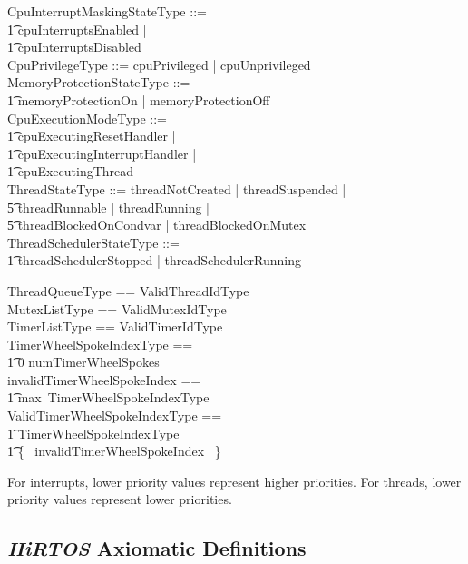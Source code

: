 \documentclass[11pt,letterpaper,twoside,openany]{book}
\begin{document}
\begin{zed}
    CpuInterruptMaskingStateType ::= \\
    \t1 cpuInterruptsEnabled | \\
    \t1 cpuInterruptsDisabled \\
    CpuPrivilegeType ::= cpuPrivileged | cpuUnprivileged \\
    MemoryProtectionStateType ::= \\
    \t1 memoryProtectionOn | memoryProtectionOff \\
    CpuExecutionModeType ::= \\
    \t1 cpuExecutingResetHandler | \\
    \t1 cpuExecutingInterruptHandler | \\
    \t1 cpuExecutingThread \\
    ThreadStateType ::= threadNotCreated | threadSuspended | \\
    \t5 threadRunnable | threadRunning | \\
    \t5 threadBlockedOnCondvar | threadBlockedOnMutex \\
    ThreadSchedulerStateType ::= \\
    \t1 threadSchedulerStopped | threadSchedulerRunning \\
\end{zed}

\begin{zed}
    ThreadQueueType == \iseq ValidThreadIdType \\
    MutexListType == \iseq ValidMutexIdType \\
    TimerListType == \iseq ValidTimerIdType \\
    TimerWheelSpokeIndexType == \\
    \t1 0 \upto numTimerWheelSpokes \\
    invalidTimerWheelSpokeIndex == \\
    \t1 max~TimerWheelSpokeIndexType \\
    ValidTimerWheelSpokeIndexType == \\
    \t1 TimerWheelSpokeIndexType ~\setminus \\
    \t1 \{~ invalidTimerWheelSpokeIndex ~\} \\
\end{zed}

For interrupts, lower priority values represent higher priorities. For threads, lower priority
values represent lower priorities.

\subsection{\emph{HiRTOS} Axiomatic Definitions}
\end{document}

